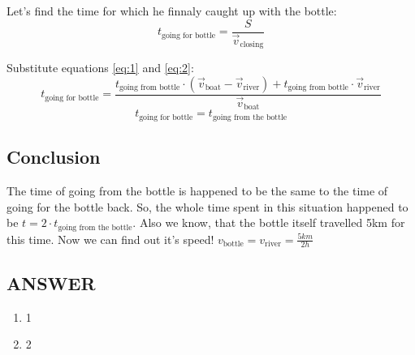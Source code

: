 Let's find the time for which he finnaly caught up with the bottle:
\begin{equation}
    \label{eq:3}
    t_{\text{going for bottle}} = \frac{S}{\Vec{v}_\text{closing}}
\end{equation}

Substitute equations \eqref{eq:1} and \eqref{eq:2}:
$$t_{\text{going for bottle}} = \frac{t_{\text{going from bottle}} \cdot (\Vec{v}_{\text{boat}} - \Vec{v}_{\text{river}}) + t_{\text{going from bottle}} \cdot \Vec{v}_{\text{river}}}{\Vec{v}_{\text{boat}}}$$ 
$$ t_{\text{going for bottle}} = t_\text{going from the bottle} $$

\subsection*{Conclusion}
The time of going from the bottle is happened to be the same to the time of going for the bottle back.
So, the whole time spent in this situation happened to be $t = 2 \cdot t_\text{going from the bottle}$. Also we know, that the bottle itself travelled 5km for this time.
Now we can find out it's speed! 
$v_\text{bottle} = v_\text{river} = \frac{5km}{2h}$



\vfill
\subsection*{ANSWER}
\begin{enumerate}
    \item 1
    \item 2
\end{enumerate}

